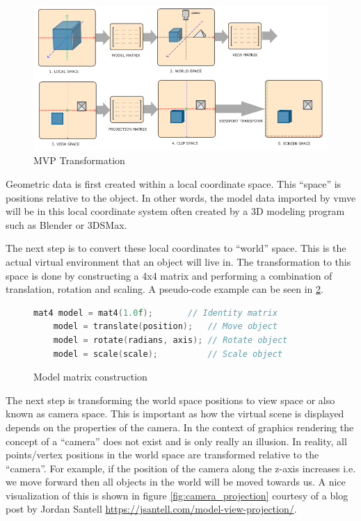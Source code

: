 \documentclass[11pt]{article}
\begin{document}
\begin{figure}[H]
  \centering
  \includegraphics[width=\textwidth]{images/mvp.png}
  \caption{MVP Transformation \cite{coordinate_systems}}
  \label{fig:mvp_transformation} 
\end{figure}

Geometric data is first created within a local coordinate space. This ``space''
is positions relative to the object. In other words, the model data imported by
\gls*{vmve} will be in this local coordinate system often created by a 3D modeling
program such as Blender or 3DSMax.

The next step is to convert these local coordinates to ``world'' space. This is
the actual virtual environment that an object will live in. The transformation
to this space is done by constructing a 4x4 matrix and performing a combination
of translation, rotation and scaling. A pseudo-code example can be seen in
\ref{fig:local_to_world}.

\begin{figure}[H]
  \centering
  \begin{lstlisting}[language=C++]
    mat4 model = mat4(1.0f);       // Identity matrix
    model = translate(position);   // Move object
    model = rotate(radians, axis); // Rotate object
    model = scale(scale);          // Scale object
  \end{lstlisting}
  \caption{Model matrix construction}
  \label{fig:local_to_world}
\end{figure}
  

The next step is transforming the world space positions to view space or also
known as camera space. This is important as how the virtual scene is displayed
depends on the properties of the camera. In the context of graphics rendering
the concept of a ``camera'' does not exist and is only really an illusion. In
reality, all points/vertex positions in the world space are transformed relative
to the ``camera''. For example, if the position of the camera along the z-axis
increases i.e. we move forward then all objects in the world will be moved
towards us. A nice visualization of this is shown in figure
\ref{fig:camera_projection} courtesy of a blog post by Jordan Santell
\href{https://jsantell.com/model-view-projection/}{https://jsantell.com/model-view-projection/}.
\end{document}
